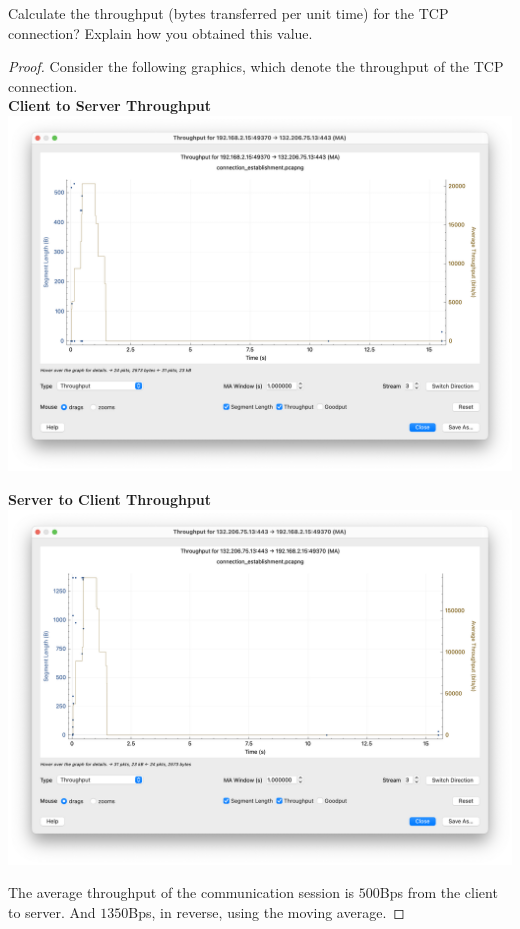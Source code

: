 \documentclass[../main.tex]{subfiles}
\begin{document}
\begin{wts}
	Calculate the throughput (bytes transferred per unit time) for the TCP connection? Explain how you obtained this value.
\end{wts}
\begin{proof}
    Consider the following graphics, which denote the throughput of the TCP connection.\\
    
    \textbf{Client to Server Throughput}\\
    \includegraphics[width=\textwidth]{subfiles/images/throughput_Q15_client_to_server.png}
    
    \textbf{Server to Client Throughput}\\
    \includegraphics[width=\textwidth]{subfiles/images/throughput_Q15_server_to_client.png}
    
    The average throughput of the communication session is $500$Bps from the client to server. And $1350$Bps, in reverse, using the moving average.
\end{proof}
\newpage
\end{document}
